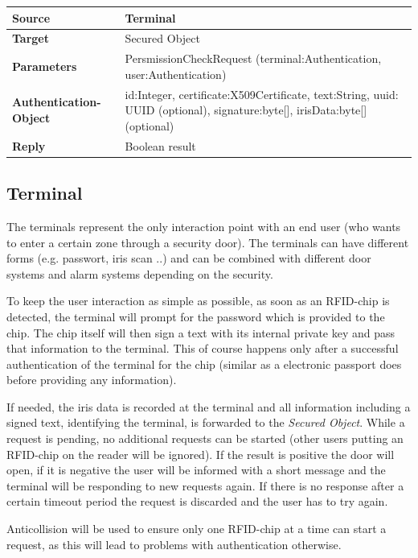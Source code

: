 \documentclass[12pt,a4paper,titlepage,oneside]{scrartcl}
\begin{document}
\begin{table}[h]
    \centering
    \begin{tabular}{|l|p{12cm}|} \hline
    \textbf{Source}&Terminal\\ \hline
    \textbf{Target}&Secured Object\\ \hline
    \textbf{Parameters}&PersmissionCheckRequest (terminal:Authentication, user:Authentication)\\ \hline
    \textbf{Authentication-Object}&id:Integer, certificate:X509Certificate, text:String, uuid: UUID (optional), signature:byte[], irisData:byte[] (optional)\\ \hline
    \textbf{Reply}&Boolean result\\ \hline
    \end{tabular}
\end{table}

\subsection{Terminal}
The terminals represent the only interaction point with an end user (who wants to enter a certain zone through a security door). The terminals can have different forms (e.g. passwort, iris scan ..) and can be combined with different door systems and alarm systems depending on the security.

To keep the user interaction as simple as possible, as soon as an RFID-chip is detected, the terminal will prompt for the password which is provided to the chip. The chip itself will then sign a text with its internal private key and pass that information to the terminal. This of course happens only after a successful authentication of the terminal for the chip (similar as a electronic passport does before providing any information).

If needed, the iris data is recorded at the terminal and all information including a signed text, identifying the terminal, is forwarded to the \emph{Secured Object}. While a request is pending, no additional requests can be started (other users putting an RFID-chip on the reader will be ignored). If the result is positive the door will open, if it is negative the user will be informed with a short message and the terminal will be responding to new requests again. If there is no response after a certain timeout period the request is discarded and the user has to try again.

Anticollision will be used to ensure only one RFID-chip at a time can start a request, as this will lead to problems with authentication otherwise.
\end{document}
